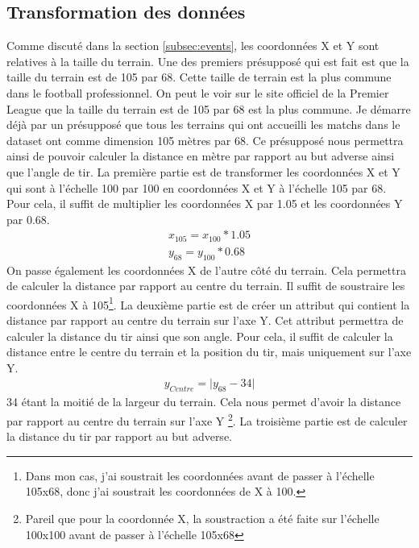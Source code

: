 \documentclass[12pt]{article}
\begin{document}
\subsection{Transformation des données}
\noindent Comme discuté dans la section \ref{subsec:events}, les coordonnées X et Y sont relatives à la taille du terrain.
Une des premiers présupposé qui est fait est que la taille du terrain est de 105 par 68.
Cette taille de terrain est la plus commune dans le football professionnel.
On peut le voir sur le site officiel de la Premier League que la taille du terrain est de 105 par 68 est la plus commune. \cite{PremierLeagueClubs} 
Je démarre déjà par un présupposé que tous les terrains qui ont accueilli les matchs dans le dataset ont comme dimension 105 mètres par 68.
Ce présupposé nous permettra ainsi de pouvoir calculer la distance en mètre par rapport au but adverse ainsi que l'angle de tir.
\newline\newline
La première partie est de transformer les coordonnées X et Y qui sont à l'échelle 100 par 100 en coordonnées X et Y à l'échelle 105 par 68.
Pour cela, il suffit de multiplier les coordonnées X par 1.05 et les coordonnées Y par 0.68.
\begin{equation}
    \begin{split}
        x_{105} = x_{100} * 1.05 \\
        y_{68} = y_{100} * 0.68
    \end{split}
\end{equation}
On passe également les coordonnées X de l'autre côté du terrain. 
Cela permettra de calculer la distance par rapport au centre du terrain.
Il suffit de soustraire les coordonnées X à 105\footnote{Dans mon cas, j'ai soustrait les coordonnées avant de passer à l'échelle 105x68, donc j'ai soustrait les coordonnées de X à 100.}.
\newline\newline
La deuxième partie est de créer un attribut qui contient la distance par rapport au centre du terrain sur l'axe Y.
Cet attribut permettra de calculer la distance du tir ainsi que son angle.
Pour cela, il suffit de calculer la distance entre le centre du terrain et la position du tir, mais uniquement sur l'axe Y.
\begin{equation}
    \begin{split}
        y_{Centre} = \lvert y_{68} - 34 \rvert
    \end{split}
\end{equation}
34 étant la moitié de la largeur du terrain. 
Cela nous permet d'avoir la distance par rapport au centre du terrain sur l'axe Y \footnote{Pareil que pour la coordonnée X, la soustraction a été faite sur l'échelle 100x100 avant de passer à l'échelle 105x68}.
\newline\newline
La troisième partie est de calculer la distance du tir par rapport au but adverse.
\end{document}
